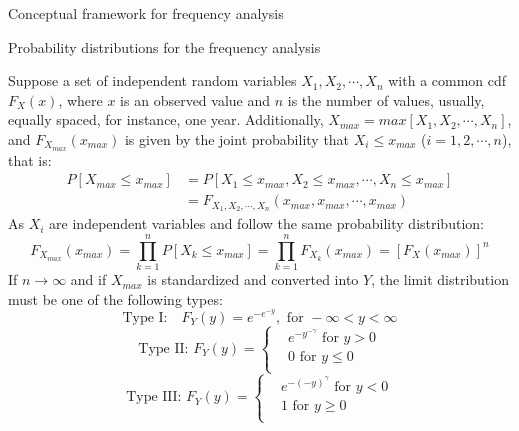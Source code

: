 \documentclass[8pt]{beamer}
\renewcommand{\emph}[1]{\textcolor{myorange}{#1}}
\begin{document}
\begin{frame}{Conceptual framework for  frequency analysis}
    \begin{block}{Probability distributions for the frequency analysis}
  \end{block}
        Suppose a set of independent random variables $X_1, X_2, \cdots, X_n$  with a common \emph{cdf} $F_X (x)$, where $x$ is an observed value and $n$ is the number of values, usually, equally spaced, for instance, one year. Additionally, $X_{max} = max[X_1 , X_2 , \cdots, X_n ]$, and $F_{X_{max}} (x_{max})$ is given by the joint probability that $X_i \leq x_{max}$ ($i=1,2,\cdots,n$), that is:
        \begin{align*}
            P[X_{max} \leq x_{max}] &= P[X_1 \leq x_{max}, X_2 \leq x_{max}, \cdots, X_n \leq x_{max}] \\
                                    &=F_{X_1, X_2, \cdots, X_n} (x_{max}, x_{max},\cdots, x_{max})
        \end{align*}
        As $X_i$ are independent variables and follow the same probability distribution:
        \[
            F_{X_{max}} (x_{max}) = \prod_{k=1}^n P[X_k \leq x_{max} ] = \prod_{k=1}^n F_{X_k} (x_{max}) = \left[  F_{X} (x_{max}) \right]^n
        \]
        If $n \rightarrow \infty$ and if $X_{max}$ is standardized and converted into $Y$, the \emph{limit distribution} must be one of the following types:
        \[
            \text{Type I:} \quad F_Y (y) = e^{-e^{-y}}, \text{ for } -\infty < y < \infty 
        \]
 \[
     \text{Type II: } F_Y (y) =
\begin{cases}
    &e^{-y^{-\gamma}} \text{ for } y > 0   \\
    &0 \text{ for } y \leq 0   \\
\end{cases}
\]
 \[
     \text{Type III: } F_Y (y) =
\begin{cases}
    &e^{-(-y)^{\gamma}} \text{ for } y < 0   \\
    &1 \text{ for } y \geq 0   \\
\end{cases}
\]
\end{frame}
\end{document}
